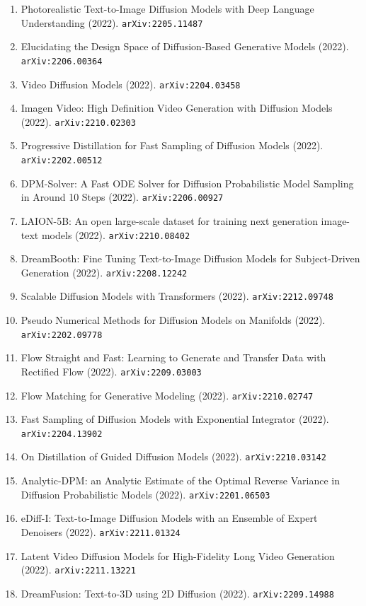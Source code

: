 \documentclass[11pt]{article}
\begin{document}
\begin{enumerate}
  \item Photorealistic Text-to-Image Diffusion Models with Deep Language
  Understanding (2022). \texttt{arXiv:2205.11487}
  \item Elucidating the Design Space of Diffusion-Based Generative Models (2022). \texttt{arXiv:2206.00364}
  \item Video Diffusion Models (2022). \texttt{arXiv:2204.03458}
  \item Imagen Video: High Definition Video Generation with Diffusion Models (2022). \texttt{arXiv:2210.02303}
  \item Progressive Distillation for Fast Sampling of Diffusion Models (2022). \texttt{arXiv:2202.00512}
  \item DPM-Solver: A Fast ODE Solver for Diffusion Probabilistic Model Sampling
  in Around 10 Steps (2022). \texttt{arXiv:2206.00927}
  \item LAION-5B: An open large-scale dataset for training next generation
  image-text models (2022). \texttt{arXiv:2210.08402}
  \item DreamBooth: Fine Tuning Text-to-Image Diffusion Models for
  Subject-Driven Generation (2022). \texttt{arXiv:2208.12242}
  \item Scalable Diffusion Models with Transformers (2022). \texttt{arXiv:2212.09748}
  \item Pseudo Numerical Methods for Diffusion Models on Manifolds (2022). \texttt{arXiv:2202.09778}
  \item Flow Straight and Fast: Learning to Generate and Transfer Data with
  Rectified Flow (2022). \texttt{arXiv:2209.03003}
  \item Flow Matching for Generative Modeling (2022). \texttt{arXiv:2210.02747}
  \item Fast Sampling of Diffusion Models with Exponential Integrator (2022). \texttt{arXiv:2204.13902}
  \item On Distillation of Guided Diffusion Models (2022). \texttt{arXiv:2210.03142}
  \item Analytic-DPM: an Analytic Estimate of the Optimal Reverse Variance in
  Diffusion Probabilistic Models (2022). \texttt{arXiv:2201.06503}
  \item eDiff-I: Text-to-Image Diffusion Models with an Ensemble of Expert
  Denoisers (2022). \texttt{arXiv:2211.01324}
  \item Latent Video Diffusion Models for High-Fidelity Long Video Generation (2022). \texttt{arXiv:2211.13221}
  \item DreamFusion: Text-to-3D using 2D Diffusion (2022). \texttt{arXiv:2209.14988}

\end{enumerate}
\end{document}
